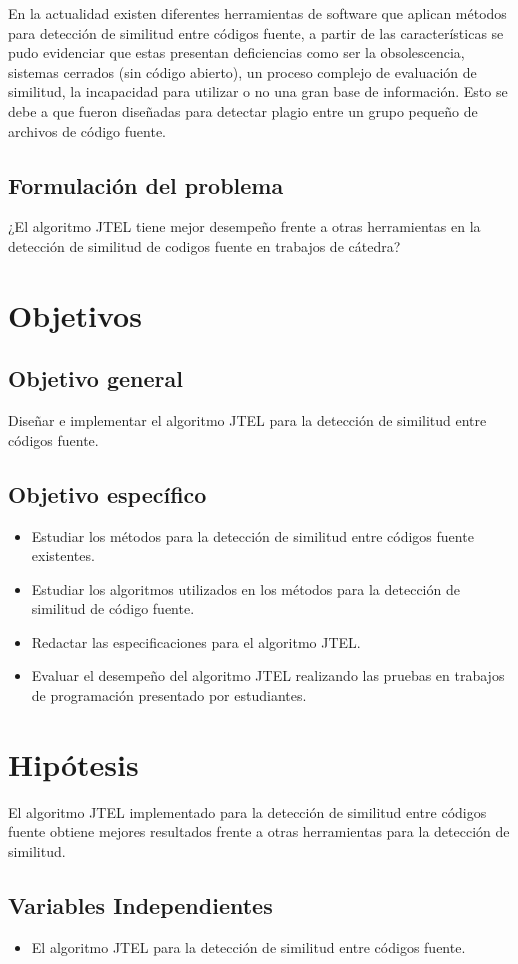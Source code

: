 En la actualidad existen diferentes herramientas de software que aplican métodos para detección de similitud entre códigos fuente, a partir de las características se pudo evidenciar que estas presentan deficiencias como ser la obsolescencia, sistemas cerrados (sin código abierto), un proceso complejo de evaluación de similitud, la incapacidad para utilizar o no una gran base de información. Esto se debe a que fueron diseñadas para detectar plagio entre un grupo pequeño de archivos de código fuente.
\subsection{Formulación del problema}
¿El algoritmo JTEL tiene mejor desempeño frente a otras herramientas en la detección de similitud de codigos fuente en trabajos de cátedra?

\section{Objetivos}
\subsection{Objetivo general}
Diseñar e implementar el algoritmo JTEL para la detección de similitud entre códigos fuente.
\subsection{Objetivo específico}
\begin{itemize}
    \item Estudiar los métodos para la detección de similitud entre códigos fuente existentes.
    \item Estudiar los algoritmos utilizados en los métodos para la detección de similitud de código fuente.
    \item Redactar las especificaciones para el algoritmo JTEL.
    \item Evaluar el desempeño del algoritmo JTEL realizando las pruebas en trabajos de programación presentado por estudiantes.
\end{itemize}

\section{Hipótesis}
El algoritmo JTEL implementado para la detección de similitud entre códigos fuente obtiene mejores resultados frente a otras herramientas para la detección de similitud.
\subsection{Variables Independientes}
\begin{itemize}
    \item El algoritmo JTEL para la detección de similitud entre códigos fuente.
\end{itemize}
